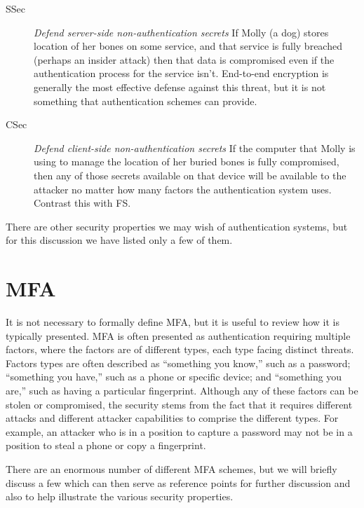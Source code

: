 \documentclass[12pt]{article}
\newcommand{\propdescription}[1]{\textit{#1}\newline}
\newcommand{\prop}[1]{\textsf{#1}}
\begin{document}
\begin{description}
  \item[SSec] \propdescription{Defend server-side non-authentication secrets}
    If Molly (a dog) stores location of her bones on some service,
    and that service is fully breached (perhaps an insider attack)
    then that data is compromised even if the authentication process for the service isn't.
    End-to-end encryption is generally the most effective defense against this threat,
    but it is not something that authentication schemes can provide.

  \item[CSec] \propdescription{Defend client-side non-authentication secrets}
    If the computer that Molly is using to manage the location of her buried bones is fully compromised,
    then any of those secrets available on that device will be available to the attacker no matter how many factors the authentication system uses.
    Contrast this with \prop{FS}.
  
\end{description}

There are other security properties we may wish of authentication systems, but for this discussion we have listed only a few of them.

\section{MFA}

It is not necessary to formally define MFA, but it is useful to review how it is typically presented.
MFA is often presented as authentication requiring multiple factors, where the factors are of different types, each type facing distinct threats.
Factors types are often described as “something you know,” such as a password;
“something you have,” such as a phone or specific device;
and “something you are,” such as having a particular fingerprint.
Although any of these factors can be stolen or compromised,
the security stems from the fact that it requires different attacks and different attacker capabilities to comprise the different types.
For example, an attacker who is in a position to capture a password may not be in a position to steal a phone or copy a fingerprint.

There are an enormous number of different MFA schemes,
but we will briefly discuss a few
which can then serve as reference points for further discussion and also to help illustrate the various security properties.
\end{document}
